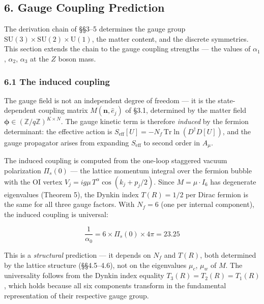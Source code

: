 \documentclass[
]{article}
\begin{document}
\hypertarget{gauge-coupling-prediction}{%
\subsection{6. Gauge Coupling
Prediction}\label{gauge-coupling-prediction}}

The derivation chain of §§3--5 determines the gauge group
\(\mathrm{SU}(3) \times \mathrm{SU}(2) \times \mathrm{U}(1)\), the
matter content, and the discrete symmetries. This section extends the
chain to the gauge coupling strengths --- the values of \(\alpha_1\),
\(\alpha_2\), \(\alpha_3\) at the \(Z\) boson mass.

\hypertarget{the-induced-coupling}{%
\subsubsection{6.1 The induced coupling}\label{the-induced-coupling}}

The gauge field is not an independent degree of freedom --- it is the
state-dependent coupling matrix \(M(\mathbf{n}, \hat{e}_j)\) of §3.1,
determined by the matter field
\(\boldsymbol{\phi} \in (\mathbb{Z}/q\mathbb{Z})^{K \times N}\). The
gauge kinetic term is therefore \emph{induced} by the fermion
determinant: the effective action is
\(S_{\text{eff}}[U] = -N_f \, \mathrm{Tr} \ln(D^\dagger D[U])\), and the
gauge propagator arises from expanding \(S_{\text{eff}}\) to second
order in \(A_\mu\).

The induced coupling is computed from the one-loop staggered vacuum
polarization \(\Pi_s(0)\) --- the lattice momentum integral over the
fermion bubble with the OI vertex
\(V_j = i g \mu \, T^\alpha \cos(k_j + p_j/2)\). Since
\(M = \mu \cdot I_6\) has degenerate eigenvalues (Theorem 5), the Dynkin
index \(T(R) = 1/2\) per Dirac fermion is the same for all three gauge
factors. With \(N_f = 6\) (one per internal component), the induced
coupling is universal:

\[\frac{1}{\alpha_0} = 6 \times \Pi_s(0) \times 4\pi = 23.25\]

This is a \emph{structural} prediction --- it depends on \(N_f\) and
\(T(R)\), both determined by the lattice structure (§§4.5--4.6), not on
the eigenvalues \(\mu_c\), \(\mu_w\) of \(M\). The universality follows
from the Dynkin index equality \(T_3(R) = T_2(R) = T_1(R)\), which holds
because all six components transform in the fundamental representation
of their respective gauge group.
\end{document}
